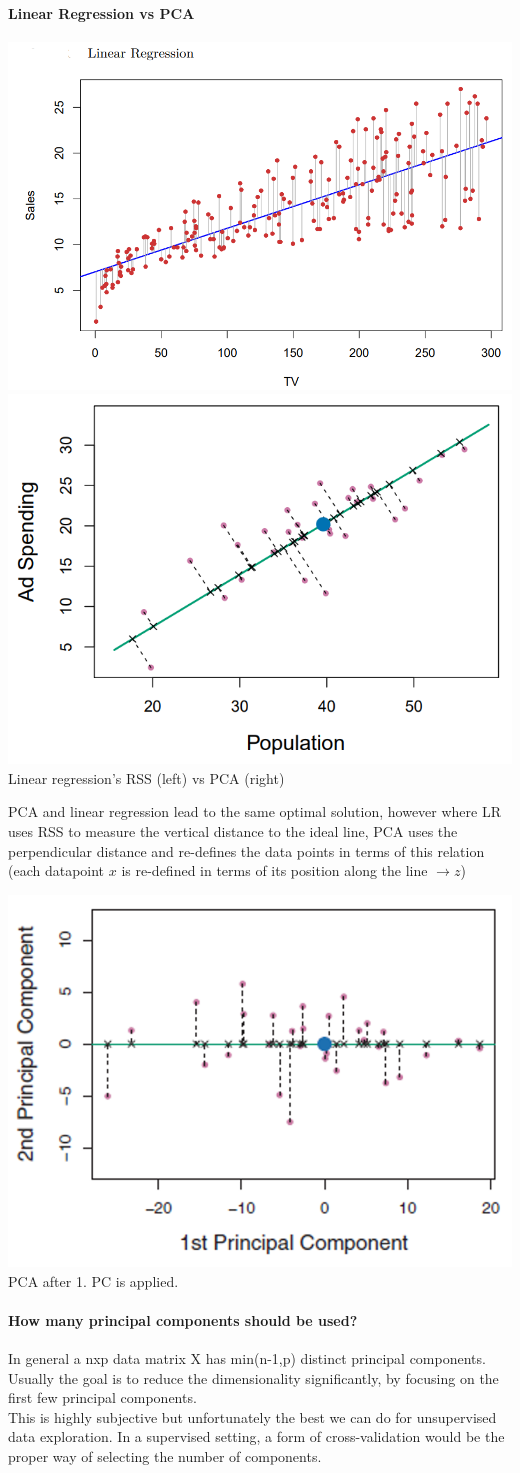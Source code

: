 \documentclass[../document.tex]{subfiles}
\begin{document}
	\paragraph{Linear Regression vs PCA}
	\begin{center}
		\includegraphics[width=.4\textwidth]{pictures/linear_regression}
		\includegraphics[width=.4\textwidth]{pictures/PCA}\\
		Linear regression's RSS (left) vs PCA (right)
	\end{center}
	PCA and linear regression lead to the same optimal solution, however where LR uses RSS to measure the vertical distance to the ideal line, PCA uses the perpendicular distance and re-defines the data points in terms of this relation (each datapoint $x$ is re-defined in terms of its position along the line $\rightarrow z$)
	\begin{center}
		\includegraphics[width=.4\textwidth]{pictures/PCA_2}\\
		PCA after 1. PC is applied.
	\end{center}


	\paragraph{How many principal components should be used?}
	In general a nxp data matrix X has min(n-1,p) distinct principal components. Usually the goal is to reduce the dimensionality significantly, by focusing on the first few principal components.\\
	This is highly subjective but unfortunately the best we can do for unsupervised data exploration. In a supervised setting, a form of cross-validation would be the proper way of selecting the number of components.
\end{document}
